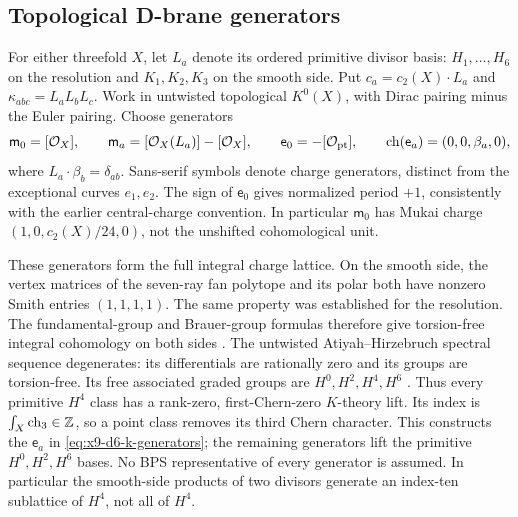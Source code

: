 \subsection{Topological D-brane generators}
For either threefold $X$, let $L_a$ denote its ordered primitive divisor
basis: $H_1,\ldots,H_6$ on the resolution and $K_1,K_2,K_3$ on the
smooth side. Put $c_a=c_2(X)\cdot L_a$ and
$\kappa_{abc}=L_aL_bL_c$. Work in untwisted topological $K^0(X)$,
with Dirac pairing minus the Euler pairing. Choose generators
\begin{equation}
 \mathsf m_0=[\mathcal O_X],\qquad
 \mathsf m_a=[\mathcal O_X(L_a)]-[\mathcal O_X],\qquad
 \mathsf e_0=-[\mathcal O_{\rm pt}],\qquad
 \operatorname{ch}(\mathsf e_a)=(0,0,\beta_a,0),
 \label{eq:x9-d6-k-generators}
\end{equation}
where $L_a\cdot\beta_b=\delta_{ab}$. Sans-serif symbols denote charge
generators, distinct from the exceptional curves $e_1,e_2$.
The sign of $\mathsf e_0$ gives
normalized period $+1$, consistently with the earlier central-charge
convention. In particular $\mathsf m_0$ has Mukai charge
$(1,0,c_2(X)/24,0)$, not the unshifted cohomological unit.

These generators form the full integral charge lattice. On the smooth
side, the vertex matrices of the seven-ray fan polytope and its polar
both have nonzero Smith entries $(1,1,1,1)$. The same property was
established for the resolution. The fundamental-group and Brauer-group
formulas therefore give torsion-free integral cohomology on both sides
\cite[Corollaries~1.9 and~3.9]{Batyrev:2005Integral}.
The untwisted Atiyah--Hirzebruch spectral sequence degenerates: its
differentials are rationally zero and its groups are torsion-free.
Its free associated graded groups are $H^0,H^2,H^4,H^6$
\cite[Section~3.1]{Maldacena:2001KCharges}.
Thus every primitive $H^4$ class has a rank-zero, first-Chern-zero
$K$-theory lift. Its index is $\int_X\operatorname{ch}_3\in\mathbb Z$,
so a point class removes its third Chern character. This constructs
the $\mathsf e_a$ in \eqref{eq:x9-d6-k-generators}; the remaining generators
lift the primitive $H^0,H^2,H^6$ bases. No BPS representative of every
generator is assumed. In particular the smooth-side products of two
divisors generate an index-ten sublattice of $H^4$, not all of $H^4$.
